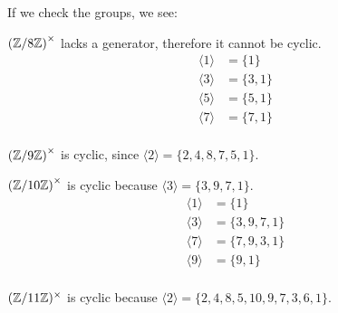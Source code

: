 \begin{problem}
\begin{enumalph}
\begin{Answer}
        If we check the groups, we see:
        \begin{enumalph}
          \item ${(\mathbb{Z}/8 \mathbb{Z})}^\times$ lacks a generator, therefore it cannot be cyclic.
            \begin{align*}
              \langle 1 \rangle &= \{ 1 \} \\
              \langle 3 \rangle &= \{ 3, 1 \} \\
              \langle 5 \rangle &= \{ 5, 1 \} \\
              \langle 7 \rangle &= \{ 7, 1 \} \\
            \end{align*} 
          \item ${(\mathbb{Z}/9 \mathbb{Z})}^\times$ is cyclic, since $\langle 2 \rangle
            = \{ 2, 4, 8, 7, 5, 1 \}$.
          \item ${(\mathbb{Z}/10 \mathbb{Z})}^\times$ is cyclic because $\langle 3 \rangle
            = \{ 3, 9, 7, 1 \}$.
          \begin{align*}
            \langle 1 \rangle &= \{ 1 \} \\
            \langle 3 \rangle &= \{ 3, 9, 7, 1 \} \\
            \langle 7 \rangle &= \{ 7, 9, 3, 1 \} \\
            \langle 9 \rangle &= \{ 9, 1 \} \\
          \end{align*}
          \item $(\mathbb{Z}/11\mathbb{Z})^\times$ is cyclic because $\langle 2 \rangle
            = \{ 2, 4, 8, 5, 10, 9, 7, 3, 6, 1 \}$.
        \end{enumalph}
      \end{Answer}

  \end{enumalph}
\end{problem}
